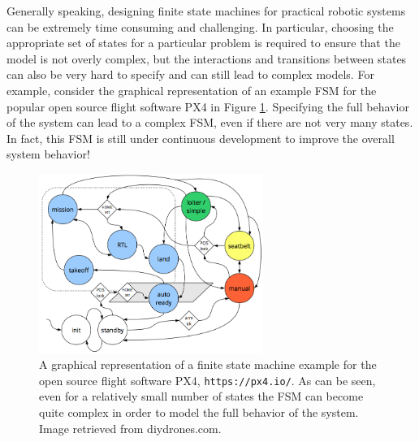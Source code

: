 Generally speaking, designing finite state machines for practical robotic systems can be extremely time consuming and challenging. In particular, choosing the appropriate set of states for a particular problem is required to ensure that the model is not overly complex, but the interactions and transitions between states can also be very hard to specify and can still lead to complex models. For example, consider the graphical representation of an example FSM for the popular open source flight software PX4 in Figure \ref{fig:px4fsm}. Specifying the full behavior of the system can lead to a complex FSM, even if there are not very many states. In fact, this FSM is still under continuous development to improve the overall system behavior!
\begin{figure}[ht]
    \centering
    \includegraphics[width=0.65\textwidth]{tex/figs/ch21_figs/px4_state_machine.png}
    \caption{A graphical representation of a finite state machine example for the open source flight software PX4, \texttt{https://px4.io/}. As can be seen, even for a relatively small number of states the FSM can become quite complex in order to model the full behavior of the system. Image retrieved from diydrones.com.}
    \label{fig:px4fsm}
\end{figure}

